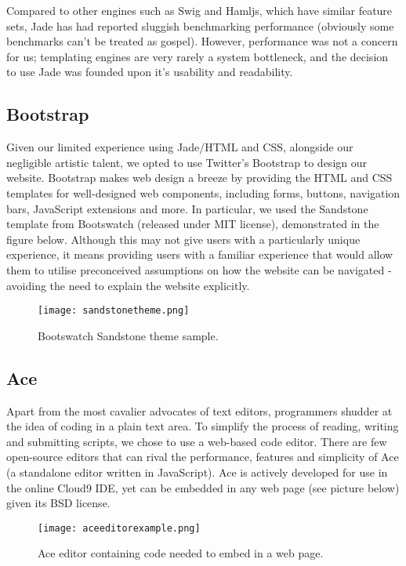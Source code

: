 \noindent Compared to other engines such as Swig and Hamljs, which have similar feature sets, Jade has had reported sluggish benchmarking performance \cite{benchmarks} (obviously some benchmarks can't be treated as gospel). However, performance was not a concern for us; templating engines are very rarely a system bottleneck, and the decision to use Jade was founded upon it's usability and readability.

\subsection{Bootstrap}
Given our limited experience using Jade/HTML and CSS, alongside our negligible artistic talent, we opted to use Twitter's Bootstrap to design our website. Bootstrap makes web design a breeze by providing the HTML and CSS templates for well-designed web components, including forms, buttons, navigation bars, JavaScript extensions and more. In particular, we used the Sandstone\cite{sandstone} template from Bootswatch (released under MIT license), demonstrated in the figure below. Although this may not give users with a particularly unique experience, it means providing users with a familiar experience that would allow them to utilise preconceived assumptions on how the website can be navigated - avoiding the need to explain the website explicitly.

\begin{figure}[H]
\centering
\texttt{[image: sandstonetheme.png]}
\caption{Bootswatch Sandstone theme sample.}
\end{figure}

\subsection{Ace}
Apart from the most cavalier advocates of text editors, programmers shudder at the idea of coding in a plain text area. To simplify the process of reading, writing and submitting scripts, we chose to use a web-based code editor. There are few open-source editors that can rival the performance, features and simplicity of Ace (a standalone editor written in JavaScript). Ace\cite{ace} is actively developed for use in the online Cloud9 IDE, yet can be embedded in any web page (see picture below) given its BSD license.

\begin{figure}[H]
\centering
\texttt{[image: aceeditorexample.png]}
\caption{Ace editor containing code needed to embed in a web page.}
\end{figure}

